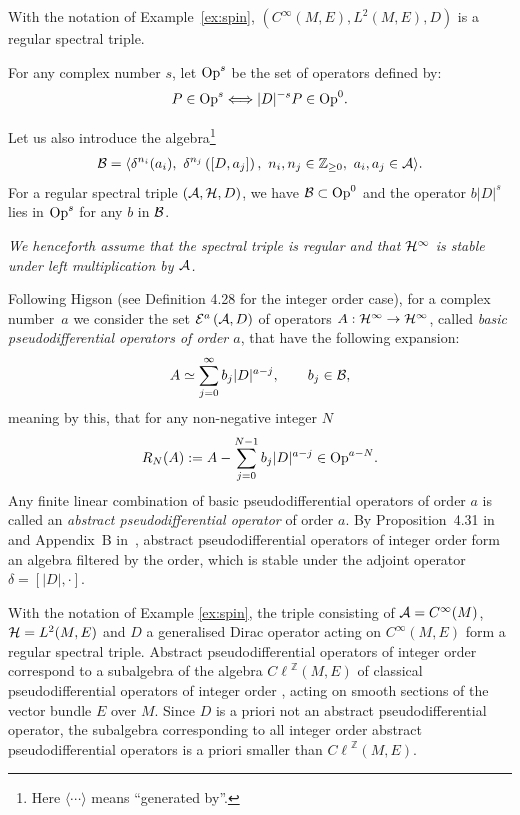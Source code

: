 \documentclass[pdftex]{sigma}
\def \Z {\mathbb Z}
\def \Ci {{C^\infty}}
\def \Cl {{C\ell}}
\numberwithin{equation}{section}
\begin{document}
\begin{example}  With the notation of Example~\ref{ex:spin}, $\left(\Ci(M, E),
L^2(M, E), D\right)$ is a regular spectral triple.
\end{example}

For any complex number $s$, let ${\rm Op}^s$ be the set
of operators def\/ined by:
\[
P\in {\rm Op}^s \Longleftrightarrow \vert D\vert^{-s} P\in {\rm Op}^0 .
\]

Let us also introduce the  algebra\footnote{Here $\langle\cdots \rangle$
means ``generated by''.}
 \begin{gather*}%
 {\cal B}=
 \langle \delta^{n_i}(a_i),\  \delta^{n_j}\left([D, a_j]\right), \  n_i, n_j\in \Z_{\geq 0}, \  a_i, a_j\in {\cal
  A}\rangle.
  \end{gather*}
 For a regular spectral triple $({\cal A}, {\cal H}, D)$, we have ${\cal B}\subset {\rm Op}^0$
and  the operator $b  \vert D\vert^s$ lies in ${\rm Op}^s$ for any $b$
in ${\cal B}$.


{\it We henceforth assume that  the spectral triple is regular and that ${\cal H}^\infty$ is stable under left
multiplication by ${\cal A}$.}

Following Higson \cite{Hig} (see Def\/inition 4.28 for the integer order case), for a complex number~$a$ we consider the set
${\cal E}^a\left({\cal A},D\right)$ of
operators $A:{\cal H}^\infty\to {\cal H}^\infty$, called  {\it  basic pseudodif\/ferential operators of order
 $a$}, that have the following expansion:
\[
A\simeq \sum_{j=0}^\infty b_j \vert D\vert^{a-j}, \qquad b_j\in {\cal
  B},
\]
   meaning by this, that for any non-negative integer $N$
\[
R_N(A):=A-\sum_{j=0}^{N-1}  b_{j} \vert D\vert^{a-j} \in {\rm  Op}^{a -N}.
\]
Any f\/inite linear combination of basic pseudodif\/ferential operators of order
$a$  is called
an {\it  abstract pseudodif\/ferential operator} of  order $a $.
By Proposition~4.31 in~\cite{Hig}
and Appendix~B in~\cite{CoMo}, abstract pseudodif\/ferential operators of integer order form an
algebra f\/iltered by the order, which is stable under the adjoint operator
$\delta=[\vert D\vert, \cdot]$.

\begin{example} With the notation  of Example \ref{ex:spin}, the triple consisting of  ${\cal A}=\Ci(M)$,
  ${\cal H}= L^2(M, E)$ and $D$ a generalised Dirac operator acting on $\Ci(M,
  E)$ form a regular spectral triple. Abstract pseudodif\/ferential operators
 of integer order correspond to a subalgebra of the algebra $\Cl^\Z(M, E)$ of classical pseudodif\/ferential operators of integer
  order \cite{Ho, Sh,Ta,Tr}, acting on smooth sections of the vector bundle $E$ over $M$. Since
   $D$ is a priori not an abstract pseudo\-dif\/ferential operator, the subalgebra
  corresponding to all integer order abstract pseudodif\/ferential operators is a
  priori smaller than  $\Cl^\Z(M, E)$.
\end{example}
\end{document}
